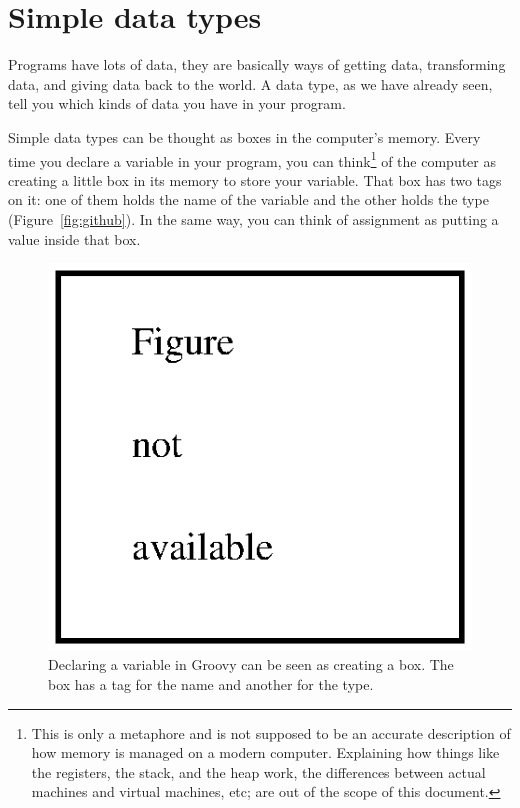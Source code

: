 
\section{Simple data types}
\label{sec:simple-data-types}

Programs have lots of data, they are basically
ways of getting data, transforming data, and giving data back to the
world. 
%
A data type, as we have already seen, tell you which kinds of data you
have in your program. 

Simple data types can be thought as boxes in the computer's
memory. Every time you declare a variable in your program, you can
think\footnote{This is only a metaphore and is not supposed to be an
  accurate description of how memory is managed on a modern
  computer. Explaining how things like the registers, the stack, and
  the heap work, the differences between actual machines and virtual
  machines, etc; are out of the scope of this document.} of the
computer as creating a little box in its memory to store your
variable. That box has two tags on it: one of them holds the name of
the variable and the other holds the type
(Figure~\ref{fig:github}). In the same way, you can think of
assignment as putting a value inside that box. 

\begin{figure}
  \centering
  \includegraphics{gfx/no_figure}
  \caption{Declaring a variable in Groovy can be seen as creating a
    box. The box has a tag for the name and another for the type.}
  \label{fig:var1}
\end{figure}

